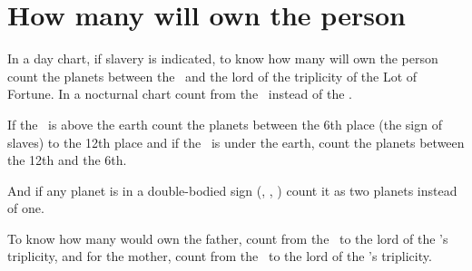 \section{How many will own the person}

In a day chart, if slavery is indicated, to know how many will own the person count the planets between the \Sun\, and the lord of the triplicity of the Lot of Fortune. In a nocturnal chart count from the \Moon\, instead of the \Sun.

If the \Moon\, is above the earth count the planets between the 6th place (the sign of slaves) to the 12th place and if the \Moon\, is under the earth, count the planets between the 12th and the 6th.

And if any planet is in a double-bodied sign (\Gemini, \Sagittarius, \Pisces) count it as two planets instead of one.

To know how many would own the father, count from the \Sun\, to the lord of the \Sun's triplicity, and for the mother, count from the \Moon\, to the lord of the \Moon's triplicity.

